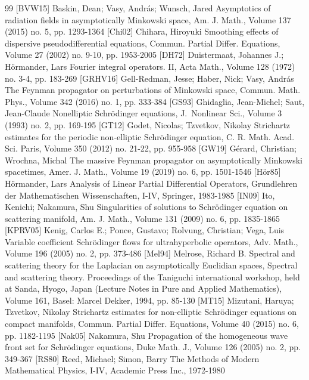 \documentclass[10pt]{amsart}
\theoremstyle{definition}
\begin{document}
\begin{thebibliography}{99}
 [BVW15] Baskin, Dean; Vasy, András; Wunsch, Jared Asymptotics of radiation fields in asymptotically Minkowski space, Am. J. Math., Volume 137 (2015) no. 5, pp. 1293-1364
 [Chi02] Chihara, Hiroyuki Smoothing effects of dispersive pseudodifferential equations, Commun. Partial Differ. Equations, Volume 27 (2002) no. 9-10, pp. 1953-2005
 [DH72] Duistermaat, Johannes J.; Hörmander, Lars Fourier integral operators. II, Acta Math., Volume 128 (1972) no. 3-4, pp. 183-269
 [GRHV16] Gell-Redman, Jesse; Haber, Nick; Vasy, András The Feynman propagator on perturbations of Minkowski space, Commun. Math. Phys., Volume 342 (2016) no. 1, pp. 333-384
 [GS93] Ghidaglia, Jean-Michel; Saut, Jean-Claude Nonelliptic Schrödinger equations, J. Nonlinear Sci., Volume 3 (1993) no. 2, pp. 169-195
 [GT12] Godet, Nicolas; Tzvetkov, Nikolay Strichartz estimates for the periodic non-elliptic Schrödinger equation, C. R. Math. Acad. Sci. Paris, Volume 350 (2012) no. 21-22, pp. 955-958
 [GW19] Gérard, Christian; Wrochna, Michal The massive Feynman propagator on asymptotically Minkowski spacetimes, Amer. J. Math., Volume 19 (2019) no. 6, pp. 1501-1546
 [Hör85] Hörmander, Lars Analysis of Linear Partial Differential Operators, Grundlehren der Mathematischen Wissenschaften, I-IV, Springer, 1983-1985
 [IN09] Ito, Kenichi; Nakamura, Shu Singularities of solutions to Schrödinger equation on scattering manifold, Am. J. Math., Volume 131 (2009) no. 6, pp. 1835-1865
 [KPRV05] Kenig, Carlos E.; Ponce, Gustavo; Rolvung, Christian; Vega, Luis Variable coefficient Schrödinger flows for ultrahyperbolic operators, Adv. Math., Volume 196 (2005) no. 2, pp. 373-486
 [Mel94] Melrose, Richard B. Spectral and scattering theory for the Laplacian on asymptotically Euclidian spaces, Spectral and scattering theory. Proceedings of the Taniguchi international workshop, held at Sanda, Hyogo, Japan (Lecture Notes in Pure and Applied Mathematics), Volume 161, Basel: Marcel Dekker, 1994, pp. 85-130
 [MT15] Mizutani, Haruya; Tzvetkov, Nikolay Strichartz estimates for non-elliptic Schrödinger equations on compact manifolds, Commun. Partial Differ. Equations, Volume 40 (2015) no. 6, pp. 1182-1195
 [Nak05] Nakamura, Shu Propagation of the homogeneous wave front set for Schrödinger equations, Duke Math. J., Volume 126 (2005) no. 2, pp. 349-367
 [RS80] Reed, Michael; Simon, Barry The Methods of Modern Mathematical Physics, I-IV, Academic Press Inc., 1972-1980

\end{thebibliography}
\end{document}
